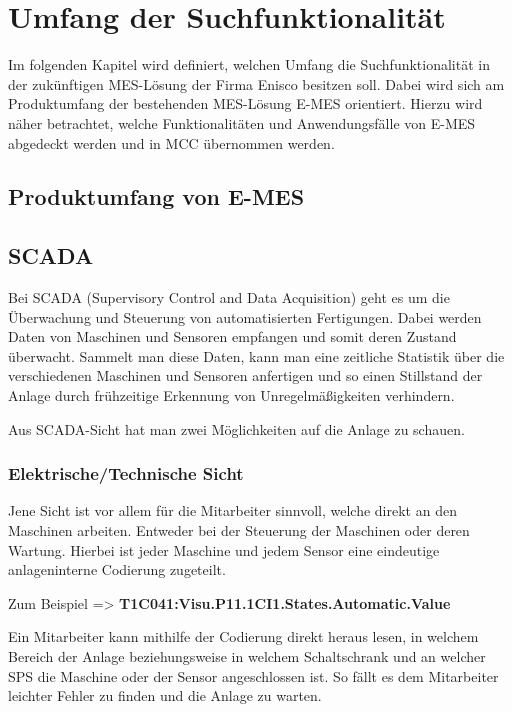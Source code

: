 \chapter{Umfang der Suchfunktionalität\label{chap3:Drittes-Kapitel}}

Im folgenden Kapitel wird definiert, welchen Umfang die Suchfunktionalität in der zukünftigen MES-Lösung der Firma Enisco besitzen soll. Dabei wird sich am Produktumfang der bestehenden MES-Lösung E-MES orientiert. Hierzu wird näher betrachtet, welche Funktionalitäten und Anwendungsfälle von E-MES abgedeckt werden und in MCC übernommen werden. 

\section{Produktumfang von E-MES\label{sec3.1:unterpunkt-1}}

\section{SCADA\label{sec3.2:unterpunkt-2}}
Bei SCADA (Supervisory Control and Data Acquisition) geht es um die Überwachung und Steuerung von automatisierten Fertigungen. Dabei werden Daten von Maschinen und Sensoren empfangen und somit deren Zustand überwacht. Sammelt man diese Daten, kann man eine zeitliche Statistik über die verschiedenen Maschinen und Sensoren anfertigen und so einen Stillstand der Anlage durch frühzeitige Erkennung von Unregelmäßigkeiten verhindern.

Aus SCADA-Sicht hat man zwei Möglichkeiten auf die Anlage zu schauen.

\subsection{Elektrische/Technische Sicht\label{subsec3.2.1:Unterunterpunkt-1}}
Jene Sicht ist vor allem für die Mitarbeiter sinnvoll, welche direkt an den Maschinen arbeiten. Entweder bei der Steuerung der Maschinen oder deren Wartung. Hierbei ist jeder Maschine und jedem Sensor eine eindeutige anlageninterne Codierung zugeteilt.

Zum Beispiel => \textbf{T1C041:Visu.P11.1CI1.States.Automatic.Value}

Ein Mitarbeiter kann mithilfe der Codierung direkt heraus lesen, in welchem Bereich der Anlage beziehungsweise in welchem Schaltschrank und an welcher SPS die Maschine oder der Sensor angeschlossen ist. So fällt es dem Mitarbeiter leichter Fehler zu finden und die Anlage zu warten.

